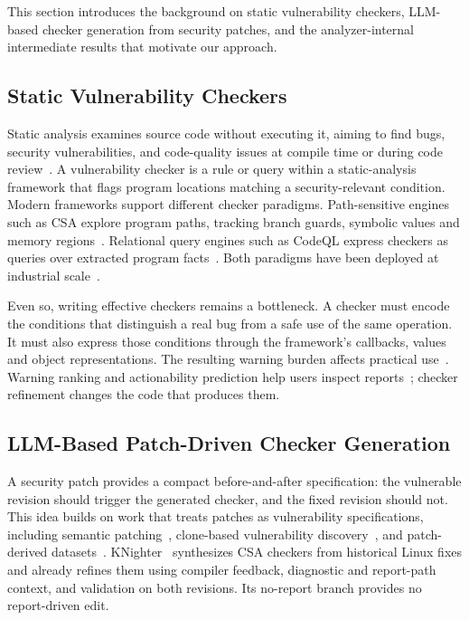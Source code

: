 This section introduces the background on static vulnerability checkers, LLM-based checker generation from security patches, and the analyzer-internal intermediate results that motivate our approach.

\subsection{Static Vulnerability Checkers}

Static analysis examines source code without executing it, aiming to find bugs, security vulnerabilities, and code-quality issues at compile time or during code review~\cite{engler2001bugs,bessey2010coverity}.
A vulnerability checker is a rule or query within a static-analysis framework that flags program locations matching a security-relevant condition.
Modern frameworks support different checker paradigms.
Path-sensitive engines such as CSA explore program paths, tracking branch guards, symbolic values and memory regions~\cite{clangsaDocs}.
Relational query engines such as CodeQL express checkers as queries over extracted program facts~\cite{avgustinov2016ql,codeqlDocs}.
Both paradigms have been deployed at industrial scale~\cite{sadowski2015tricorder,calcagno2015infer}.

Even so, writing effective checkers remains a bottleneck.
A checker must encode the conditions that distinguish a real bug from a safe use of the same operation.
It must also express those conditions through the framework's callbacks, values and object representations.
The resulting warning burden affects practical use~\cite{johnson2013why,heckman2011alerts}.
Warning ranking and actionability prediction help users inspect reports~\cite{kremenek2002zranking,ruthruff2008actionable}; checker refinement changes the code that produces them.

\subsection{LLM-Based Patch-Driven Checker Generation}

A security patch provides a compact before-and-after specification: the vulnerable revision should trigger the generated checker, and the fixed revision should not.
This idea builds on work that treats patches as vulnerability specifications, including semantic patching~\cite{padioleau2008coccinelle}, clone-based vulnerability discovery~\cite{jang2012redebug,kim2017vuddy}, and patch-derived datasets~\cite{fan2020bigvul}.
KNighter~\cite{yang2025knighter} synthesizes CSA checkers from historical Linux fixes and already refines them using compiler feedback, diagnostic and report-path context, and validation on both revisions.
Its no-report branch provides no report-driven edit.


